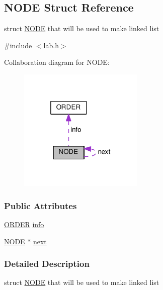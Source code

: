 \hypertarget{structNODE}{\subsection{N\+O\+D\+E Struct Reference}
\label{structNODE}
}


struct \hyperlink{structNODE}{N\+O\+D\+E} that will be used to make linked list  




{\ttfamily \#include $<$lab.\+h$>$}



Collaboration diagram for N\+O\+D\+E\+:\nopagebreak
\begin{figure}[H]
\begin{center}
\leavevmode
\includegraphics[width=169pt]{structNODE__coll__graph}
\end{center}
\end{figure}
\subsubsection*{Public Attributes}
\begin{DoxyCompactItemize}
\item 
\hyperlink{structORDER}{O\+R\+D\+E\+R} \hyperlink{structNODE_a8ae24fb8df6ea326ce23cab9331efdd6}{info}
\item 
\hyperlink{structNODE}{N\+O\+D\+E} $\ast$ \hyperlink{structNODE_a078472e8ab2d2fe38e052f5c2a425618}{next}
\end{DoxyCompactItemize}


\subsubsection{Detailed Description}
struct \hyperlink{structNODE}{N\+O\+D\+E} that will be used to make linked list 

